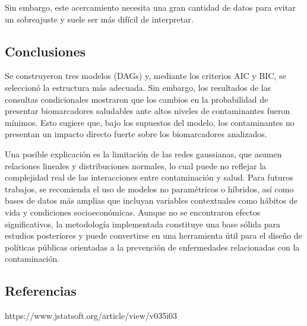 \documentclass[
  11pt,
  a4paper,
]{article}
\begin{document}
Sin embargo, este acercamiento necesita una gran cantidad de datos para
evitar un sobreajuste y suele ser más difícil de interpretar.

\subsection{Conclusiones}\label{conclusiones}

Se construyeron tres modelos (DAGs) y, mediante los criterios AIC y BIC,
se seleccionó la estructura más adecuada. Sin embargo, los resultados de
las consultas condicionales mostraron que los cambios en la probabilidad
de presentar biomarcadores saludables ante altos niveles de
contaminantes fueron mínimos. Esto sugiere que, bajo los supuestos del
modelo, los contaminantes no presentan un impacto directo fuerte sobre
los biomarcadores analizados.

Una posible explicación es la limitación de las redes gaussianas, que
asumen relaciones lineales y distribuciones normales, lo cual puede no
reflejar la complejidad real de las interacciones entre contaminación y
salud. Para futuros trabajos, se recomienda el uso de modelos no
paramétricos o híbridos, así como bases de datos más amplias que
incluyan variables contextuales como hábitos de vida y condiciones
socioeconómicas. Aunque no se encontraron efectos significativos, la
metodología implementada constituye una base sólida para estudios
posteriores y puede convertirse en una herramienta útil para el diseño
de políticas públicas orientadas a la prevención de enfermedades
relacionadas con la contaminación.

\subsection{Referencias}\label{referencias}

https://www.jstatsoft.org/article/view/v035i03
\end{document}
